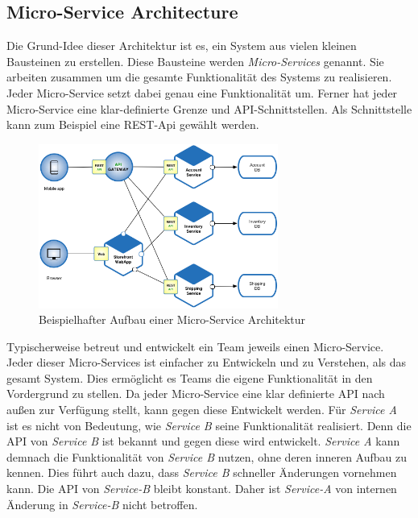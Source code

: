 \subsection{Micro-Service Architecture}
Die Grund-Idee dieser Architektur ist es, ein System aus vielen kleinen Bausteinen zu erstellen. Diese Bausteine werden\textit{ Micro-Services} genannt. Sie arbeiten zusammen um die gesamte Funktionalität des Systems zu realisieren. Jeder Micro-Service setzt dabei genau eine Funktionalität um. Ferner hat jeder Micro-Service eine klar-definierte Grenze und API-Schnittstellen. Als Schnittstelle kann zum Beispiel eine REST-Api gewählt werden. \cite{chris_richardson_microservices_nodate}
\begin{figure}[bth] 
  \centering
  \includegraphics[width=0.7\textwidth]{Chapters/2-Grundlagen/Graphics/Microservice_Architecture.png}
  \caption{Beispielhafter Aufbau einer Micro-Service Architektur \cite{chris_richardson_microservices_nodate}}
  \label{fig:microservices}
\end{figure}
Typischerweise betreut und entwickelt ein Team jeweils einen Micro-Service. \\
Jeder dieser Micro-Services ist einfacher zu Entwickeln und zu Verstehen, als das gesamt System. Dies ermöglicht es Teams die eigene Funktionalität in den Vordergrund zu stellen. Da jeder Micro-Service eine klar definierte API nach außen zur Verfügung stellt, kann gegen diese Entwickelt werden. Für \textit{Service A} ist es nicht von Bedeutung, wie \textit{Service B} seine Funktionalität realisiert. Denn die API von \textit{Service B} ist bekannt und gegen diese wird entwickelt. \textit{Service A} kann demnach die Funktionalität von \textit{Service B} nutzen, ohne deren inneren Aufbau zu kennen. Dies führt auch dazu, dass \textit{Service B} schneller Änderungen vornehmen kann. Die API von \textit{Service-B} bleibt konstant. Daher ist \textit{Service-A} von internen Änderung in \textit{Service-B} nicht betroffen. \\
